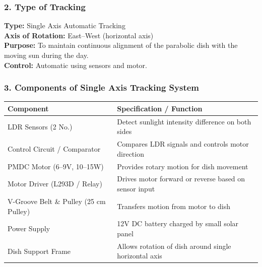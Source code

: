 \subsubsection*{2. Type of Tracking}
\noindent
{\fontsize{10}{14}\selectfont
\textbf{Type:} Single Axis Automatic Tracking\\[1mm]
\textbf{Axis of Rotation:} East--West (horizontal axis)\\[1mm]
\textbf{Purpose:} To maintain continuous alignment of the parabolic dish with the moving sun during the day.\\[1mm]
\textbf{Control:} Automatic using sensors and motor.
}

\vspace{3mm}
\subsubsection*{3. Components of Single Axis Tracking System}
\begin{center}
\renewcommand{\arraystretch}{1.2}
\begin{tabular}{|p{42mm}|p{82mm}|}
\hline
\rowcolor{gray!20}
\textbf{Component} & \textbf{Specification / Function} \\
\hline
LDR Sensors (2 No.) & Detect sunlight intensity difference on both sides \\
\hline
Control Circuit / Comparator & Compares LDR signals and controls motor direction \\
\hline
PMDC Motor (6--9V, 10--15W) & Provides rotary motion for dish movement \\
\hline
Motor Driver (L293D / Relay) & Drives motor forward or reverse based on sensor input \\
\hline
V-Groove Belt \& Pulley (25 cm Pulley) & Transfers motion from motor to dish \\
\hline
Power Supply & 12V DC battery charged by small solar panel \\
\hline
Dish Support Frame & Allows rotation of dish around single horizontal axis \\
\hline
\end{tabular}
\end{center}

\vspace{2mm}

